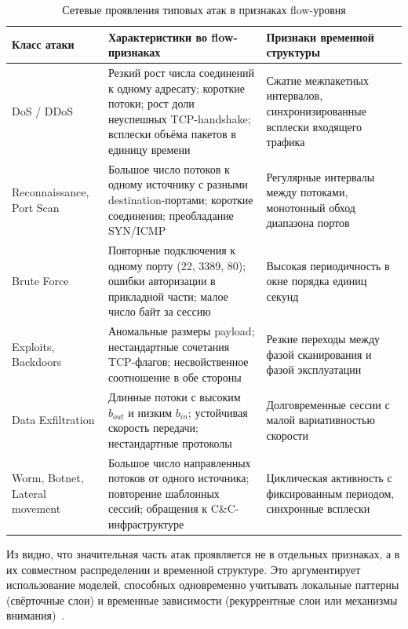 \begin{table}[H]
\centering
\caption{Сетевые проявления типовых атак в признаках flow-уровня}
\label{tab:traffic-anomalies}
\renewcommand{\arraystretch}{1.2}
\begin{tabularx}{\linewidth}{@{}lXX@{}}
\toprule
\textbf{Класс атаки} & \textbf{Характеристики во flow-признаках} & \textbf{Признаки временной структуры} \\
\midrule
DoS / DDoS &
Резкий рост числа соединений к одному адресату; короткие потоки; рост доли
неуспешных TCP-handshake; всплески объёма пакетов в единицу времени &
Сжатие межпакетных интервалов, синхронизированные всплески входящего трафика \\
\addlinespace
Reconnaissance, Port Scan &
Большое число потоков к одному источнику с разными destination-портами;
короткие соединения; преобладание SYN/ICMP &
Регулярные интервалы между потоками, монотонный обход диапазона портов \\
\addlinespace
Brute Force &
Повторные подключения к одному порту (22, 3389, 80); ошибки авторизации в
прикладной части; малое число байт за сессию &
Высокая периодичность в окне порядка единиц секунд \\
\addlinespace
Exploits, Backdoors &
Аномальные размеры payload; нестандартные сочетания TCP-флагов;
несвойственное соотношение в обе стороны &
Резкие переходы между фазой сканирования и фазой эксплуатации \\
\addlinespace
Data Exfiltration &
Длинные потоки с высоким \(b_{out}\) и низким \(b_{in}\); устойчивая
скорость передачи; нестандартные протоколы &
Долговременные сессии с малой вариативностью скорости \\
\addlinespace
Worm, Botnet, Lateral movement &
Большое число направленных потоков от одного источника; повторение шаблонных
сессий; обращения к C\&C-инфраструктуре &
Циклическая активность с фиксированным периодом, синхронные всплески \\
\bottomrule
\end{tabularx}
\end{table}

Из  видно, что значительная часть атак проявляется
не в отдельных признаках, а в их совместном распределении и временной структуре.
Это аргументирует использование моделей, способных одновременно учитывать
локальные паттерны (свёрточные слои) и временные зависимости (рекуррентные слои
или механизмы внимания)~\cite{kim2016lstm, yin2017dlrnn, vinayakumar2019dl}.

